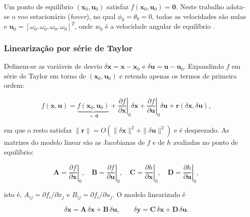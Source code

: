 Um ponto de equilíbrio $(\mathbf{x}_0,\mathbf{u}_0)$ satisfaz $f(\mathbf{x}_0,\mathbf{u}_0)=\mathbf{0}$. Neste trabalho adota-se o voo estacionário (\textit{hover}), no qual $\phi_0=\theta_0=0$, todas as velocidades são nulas e $\mathbf{u}_0=[\omega_0,\omega_0,\omega_0,\omega_0]^T$, onde $w_0$ é a velocidade angular de equilíbrio \cite{quan2017}.

\subsubsection{Linearização por série de Taylor}

Definem-se as variáveis de desvio $\delta\mathbf{x}=\mathbf{x}-\mathbf{x}_0$ e $\delta\mathbf{u}=\mathbf{u}-\mathbf{u}_0$. Expandindo $f$ em série de Taylor em torno de $(\mathbf{x}_0,\mathbf{u}_0)$ e retendo apenas os termos de primeira ordem:

\begin{equation}\label{eq:taylor}
f(\mathbf{x},\mathbf{u}) = \underbrace{f(\mathbf{x}_0,\mathbf{u}_0)}_{=\,\mathbf{0}} + \left.\frac{\partial f}{\partial \mathbf{x}}\right|_{0}\delta\mathbf{x} + \left.\frac{\partial f}{\partial \mathbf{u}}\right|_{0}\delta\mathbf{u} + \mathbf{r}(\delta\mathbf{x},\delta\mathbf{u}),
\end{equation}

\noindent em que o resto satisfaz $\|\mathbf{r}\| = O\!\left(\|\delta\mathbf{x}\|^2+\|\delta\mathbf{u}\|^2\right)$ e é desprezado. As matrizes do modelo linear são as Jacobianas de $f$ e de $h$ avaliadas no ponto de equilíbrio:

\begin{equation}\label{eq:jacobianas}
\mathbf{A}=\left.\frac{\partial f}{\partial \mathbf{x}}\right|_{0},\quad
\mathbf{B}=\left.\frac{\partial f}{\partial \mathbf{u}}\right|_{0},\quad
\mathbf{C}=\left.\frac{\partial h}{\partial \mathbf{x}}\right|_{0},\quad
\mathbf{D}=\left.\frac{\partial h}{\partial \mathbf{u}}\right|_{0},
\end{equation}

\noindent isto é, $A_{ij}=\partial f_i/\partial x_j$ e $B_{ij}=\partial f_i/\partial u_j$. O modelo linearizado é

\begin{equation}\label{eq:ss_linear}
\delta\dot{\mathbf{x}} = \mathbf{A}\,\delta\mathbf{x} + \mathbf{B}\,\delta\mathbf{u}, \qquad
\delta\mathbf{y} = \mathbf{C}\,\delta\mathbf{x} + \mathbf{D}\,\delta\mathbf{u}.
\end{equation}

